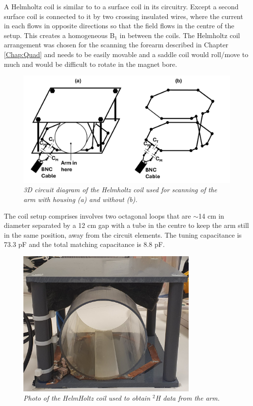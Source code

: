 A Helmholtz coil is similar to to a surface coil in its circuitry. Except a second surface coil is connected to it by two crossing insulated wires, where the current in each flows in opposite directions so that the field flows in the centre of the setup. This creates a homogeneous B$_1$ in between the coils. The Helmholtz coil arrangement was chosen for the scanning the forearm described in Chapter \ref{Chap:Quad} and needs to be easily movable and a saddle coil would roll/move to much and would be difficult to rotate in the magnet bore.

\begin{figure}
    \centering
    \includegraphics[width=1\textwidth]{Figures/Coils/3D_Helmholtz.png}
    \caption{\textit{3D circuit diagram of the Helmholtz coil used for scanning of the arm with housing (a) and without (b).}}
    \label{fig:coils:3D_Helmholtz}
\end{figure}

The coil setup comprises involves two octagonal loops that are $\sim$14 cm in diameter separated by a 12 cm gap with a tube in the centre to keep the arm still in the same position, away from the circuit elements. The tuning capacitance is 73.3 pF and the total matching capacitance is 8.8 pF.

\begin{figure}
    \centering
    \includegraphics[width=0.8\textwidth]{Figures/Coils/HelmHoltz_Coil.jpg}
    \caption{\textit{Photo of the HelmHoltz coil used to obtain $^2$H data from the arm.}}
    \label{fig:coils:HelmHoltz_pic}
\end{figure}